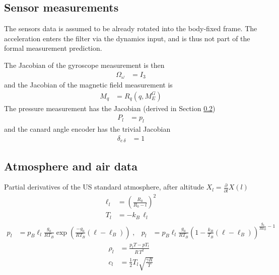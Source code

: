 \subsection{Sensor measurements}
\label{sec:jacobians-sensors}
The sensors data is assumed to be already rotated into the body-fixed frame.
The acceleration enters the filter via the dynamics input, and is thus not part of the formal measurement prediction.

The Jacobian of the gyroscope measurement is then 
\begin{align}
    \Omega_\omega &= I_3
\end{align}
and the Jacobian of the magnetic field measurement is 
\begin{align}
    M_q &= R_q(q,M_E^G)
\end{align}
The pressure measurement has the Jacobian (derived in Section \ref{sec:appendix-atmosphere})
\begin{align}
    P_l &= p_l
\end{align}
and the canard angle encoder has the trivial Jacobian 
\begin{align}
    \delta_{e \, \delta} &= 1
\end{align}

\subsection{Atmosphere and air data}
\label{sec:appendix-atmosphere}

Partial derivatives of the US standard atmosphere, after altitude $X_l = \frac{\partial}{\partial l} X(l)$
\begin{align}
    \ell_l &= \left(\frac{R_0}{R_0 - l}\right)^2 \\
    T_l &= -k_B \, \ell_l
\end{align}
\begin{align}
    p_l &= p_B \ell_l \frac{g_0}{R T_B} \exp \left( \frac{-g_0}{R T_B} (\ell-\ell_B) \right) \; , &
    p_l &= p_B \ell_l \frac{g_0}{R T_B} \left( 1 - \frac{k_B}{T_B} (\ell-\ell_B) \right) ^{\frac{g_0}{R k_B} -1}
\end{align}
\begin{align}
    \rho_l &= \frac{p_l T - p T_l}{R \, T^2} \\
    c_l &= \frac{1}{2} T_l \sqrt{\frac{\gamma R}{ T}}
\end{align}

